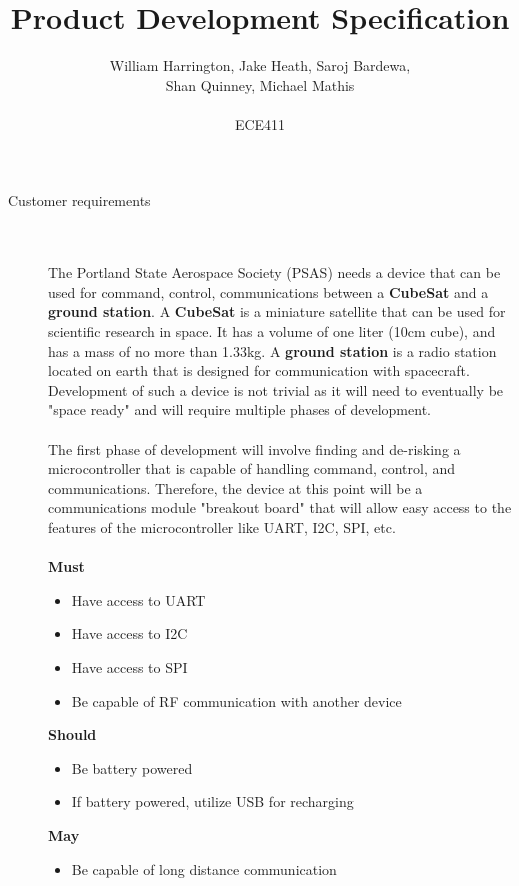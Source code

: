 \documentclass[12pt]{article}
\begin{document}
\title{Product Development Specification}%
\author{William Harrington, Jake Heath, Saroj Bardewa,\\ Shan Quinney, Michael Mathis\\ \\ %
ECE411} %
 
\maketitle
 \small
\begin{description} 
	\item[Customer requirements] \hfill \\ \\
		The Portland State Aerospace Society (PSAS) needs a device that can be used for command, control, communications between a \textbf{CubeSat} and a \textbf{ground station}.
		A \textbf{CubeSat} is a miniature satellite that can be used for scientific research in space. It has a volume of one liter (10cm cube), and has a mass of no more than 1.33kg. 
		A \textbf{ground station} is a radio station located on earth that is designed for communication with spacecraft.
		Development of such a device is not trivial as it will need to eventually be "space ready" and will require multiple phases of development. \hfill \\ \\
		The first phase of development will involve finding and de-risking a microcontroller that is capable of handling command, control, and communications. 
		Therefore, the device at this point will be a communications module "breakout board" that will allow easy access to the features of the microcontroller like UART, I2C, SPI, etc. 
		\hfill \\ \\
		\newpage
		\textbf{Must}
		\begin{itemize}
			\item{Have access to UART}
			\item{Have access to I2C}
			\item{Have access to SPI}
			\item{Be capable of RF communication with another device}
		\end{itemize}
		\textbf{Should}
		\begin{itemize}
			\item{Be battery powered}
			\item{If battery powered, utilize USB for recharging}
		\end{itemize}
		\textbf{May}
		\begin{itemize}
			\item{Be capable of long distance communication}
		\end{itemize}
\end{description}
\end{document}
